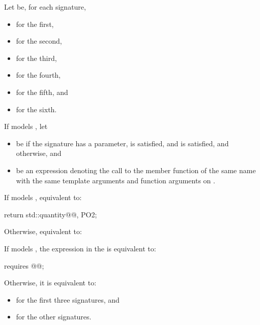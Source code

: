\begin{itemdescr}
\pnum
Let  be, for each signature,
\begin{itemize}
\item
{} for the first,
\item
{} for the second,
\item
{} for the third,
\item
{} for the fourth,
\item
{} for the fifth, and
\item
{} for the sixth.
\end{itemize}

\pnum
If  models , let
\begin{itemize}
\item
{} be 
if the signature has a  parameter,
 is satisfied, and
 is satisfied,
and  otherwise, and
\item
{} be an expression denoting
the call to the member function of the same name
with the same template arguments and function arguments
on .
\end{itemize}

\pnum
\effects
If  models , equivalent to:
\begin{codeblock}
return std::quantity{@@, PO2};
\end{codeblock}
Otherwise, equivalent to: 

\pnum
\remarks
If  models ,
the expression in the  is equivalent to:
\begin{codeblock}
requires { @@; }
\end{codeblock}
Otherwise, it is equivalent to:
\begin{itemize}
\item
{}
for the first three signatures, and
\item
{} for the other signatures.
\end{itemize}


\end{itemdescr}
